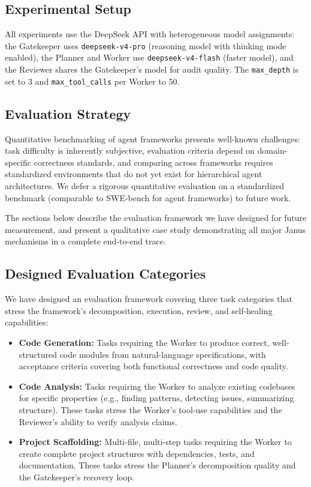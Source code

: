 \documentclass[11pt,a4paper]{article}
\begin{document}
\subsection{Experimental Setup}

All experiments use the DeepSeek API with heterogeneous model assignments:
the Gatekeeper uses \texttt{deepseek-v4-pro} (reasoning model with thinking
mode enabled), the Planner and Worker use \texttt{deepseek-v4-flash} (faster
model), and the Reviewer shares the Gatekeeper's model for audit quality.
The \texttt{max\_depth} is set to 3 and \texttt{max\_tool\_calls} per Worker
to 50.

\subsection{Evaluation Strategy}

Quantitative benchmarking of agent frameworks presents well-known
challenges: task difficulty is inherently subjective, evaluation criteria
depend on domain-specific correctness standards, and comparing across
frameworks requires standardized environments that do not yet exist for
hierarchical agent architectures. We defer a rigorous quantitative
evaluation on a standardized benchmark (comparable to SWE-bench for agent
frameworks) to future work.

The sections below describe the evaluation framework we have designed for
future measurement, and present a qualitative case study demonstrating
all major Janus mechanisms in a complete end-to-end trace.

\subsection{Designed Evaluation Categories}

We have designed an evaluation framework covering three task categories
that stress the framework's decomposition, execution, review, and
self-healing capabilities:

\begin{itemize}[leftmargin=*,itemsep=2pt]
    \item \textbf{Code Generation:} Tasks requiring the Worker to produce
    correct, well-structured code modules from natural-language
    specifications, with acceptance criteria covering both functional
    correctness and code quality.

    \item \textbf{Code Analysis:} Tasks requiring the Worker to analyze
    existing codebases for specific properties (e.g., finding patterns,
    detecting issues, summarizing structure). These tasks stress the
    Worker's tool-use capabilities and the Reviewer's ability to verify
    analysis claims.

    \item \textbf{Project Scaffolding:} Multi-file, multi-step tasks
    requiring the Worker to create complete project structures with
    dependencies, tests, and documentation. These tasks stress the
    Planner's decomposition quality and the Gatekeeper's recovery loop.
\end{itemize}
\end{document}
